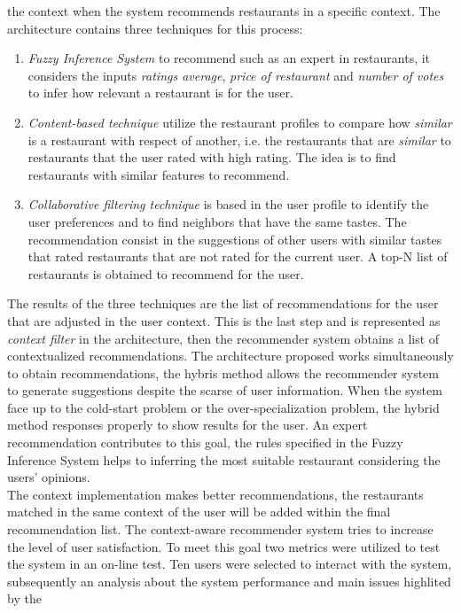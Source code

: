 the context when the system recommends restaurants in a specific
context. The architecture contains three techniques for this process:
\begin{enumerate}  
\item \textit{Fuzzy Inference System} to recommend such as an expert in
restaurants, it considers the inputs \textit{ratings average},
\textit{price of restaurant} and \textit{number of votes} to infer
how relevant a restaurant is for the user.  
\item \textit{Content-based technique} utilize the restaurant profiles 
to compare how \textit{similar} is a restaurant with respect of another, i.e.  
the restaurants that are \textit{similar} to restaurants 
that the user rated with high rating. The idea is to find restaurants 
with similar features to recommend. 
\item \textit{Collaborative filtering
technique} is based in the user profile to identify the user
preferences and to find neighbors that have the same tastes. The
recommendation consist in the suggestions of other users with similar
tastes that rated restaurants that are not rated for the current user.
A top-N list of restaurants is obtained to recommend for the user. 
\end{enumerate}  
The results of the three techniques are the list of
recommendations for the user that  are adjusted in the user context.
This is the last step and is represented as \textit{context filter} in
the architecture, then the recommender system obtains a list of
contextualized recommendations. The architecture proposed works
simultaneously to obtain recommendations, the hybris method allows the
recommender system to generate suggestions despite the scarse
of user information. When the system face up to the cold-start
problem or the over-specialization problem, the hybrid method
responses properly to show results for the user. An expert 
recommendation contributes to this goal, the rules specified in 
the Fuzzy Inference System helps to inferring the most suitable 
restaurant considering the users' opinions.\\
The context implementation makes better recommendations, the
restaurants matched in the same context of the user will be added
within the final recommendation list. The context-aware recommender
system tries to increase the level of user satisfaction. To meet this
goal two metrics were utilized to test the system in an on-line test.
Ten users were selected to interact with the system, subsequently an
analysis about the system performance and main issues highlited by the
